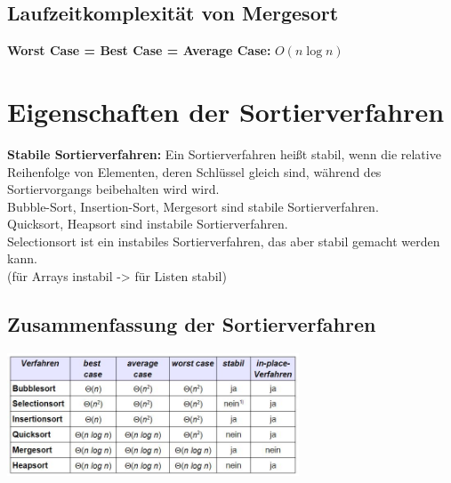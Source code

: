 \documentclass{scrreprt}
\begin{document}
\subsection{Laufzeitkomplexität von Mergesort}
\textbf{Worst Case = Best Case = Average Case:} $O(n \log n)$
\section{Eigenschaften der Sortierverfahren}
\textbf{Stabile Sortierverfahren:} Ein Sortierverfahren heißt stabil, wenn die relative Reihenfolge von Elementen,
deren Schlüssel gleich sind, während des Sortiervorgangs beibehalten wird wird.
\\Bubble-Sort, Insertion-Sort, Mergesort sind stabile Sortierverfahren.
\\Quicksort, Heapsort sind instabile Sortierverfahren.
\\Selectionsort ist ein instabiles Sortierverfahren, das aber stabil gemacht werden kann.
\\(für Arrays instabil -> für Listen stabil)
\subsection{Zusammenfassung der Sortierverfahren}
\includegraphics[width=0.65\textwidth]{graphics/sortierverfahren-table}
\end{document}
